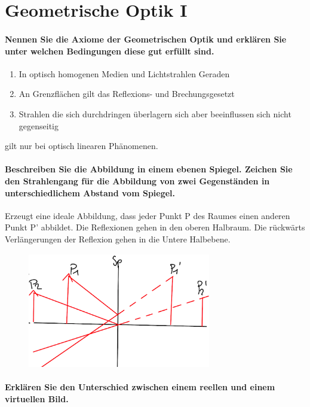 \documentclass[a4paper, 11pt, ngerman, parskip=half]{scrartcl}
\begin{document}
\newpage

\section{Geometrische Optik I}


\paragraph{Nennen Sie die Axiome der Geometrischen Optik und erklären Sie unter welchen Bedingungen
diese gut erfüllt sind.}

\begin{enumerate}
\item In optisch homogenen Medien und Lichtstrahlen Geraden
\item An Grenzflächen gilt das Reflexions- und Brechungsgesetzt
\item Strahlen die sich durchdringen überlagern sich aber beeinflussen sich nicht gegenseitig
\end{enumerate}
 
gilt nur bei optisch linearen Phänomenen.

\paragraph{Beschreiben Sie die Abbildung in einem ebenen Spiegel. Zeichen Sie den Strahlengang für
die Abbildung von zwei Gegenständen in unterschiedlichem Abstand vom Spiegel.}

Erzeugt eine ideale Abbildung, dass jeder Punkt P des Raumes einen anderen Punkt P' abbildet. Die Reflexionen gehen in den oberen Halbraum.  Die rückwärts Verlängerungen der Reflexion gehen in die Untere Halbebene.

\begin{figure}[H]
    \centering
    \includegraphics[width=8cm]{image/17/geo12}
\end{figure}


\paragraph{Erklären Sie den Unterschied zwischen einem reellen und einem virtuellen Bild.}
\end{document}

